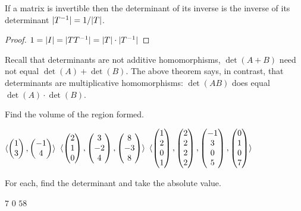\begin{corollary}
If a matrix is invertible then the determinant of its inverse is the
inverse of its determinant $\deter{T^{-1}}=1/\deter{T}$.
\end{corollary}

\begin{proof}
$1=\deter{I}=\deter{TT^{-1}}=\deter{T}\cdot\deter{T^{-1}}$  
\end{proof}

Recall that determinants are not additive homomorphisms, 
$\det(A+B)$ need not equal $\det(A)+\det(B)$.
The above theorem says, in contrast, that determinants are
multiplicative homomorphisms:
$\det(AB)$ does equal $\det(A)\cdot \det(B)$.


\begin{exercises}
  \item 
    Find the volume of the region formed.
    \begin{exparts}
      \partsitem $\langle\begin{pmatrix} 1 \\ 3 \end{pmatrix},\begin{pmatrix} -1 \\ 4 \end{pmatrix}\rangle$
      \partsitem $\langle\begin{pmatrix} 2 \\ 1 \\ 0 \end{pmatrix},\begin{pmatrix} 3 \\ -2 \\ 4 \end{pmatrix},
                              \begin{pmatrix} 8 \\ -3 \\ 8 \end{pmatrix}\rangle$
      \partsitem $\langle\begin{pmatrix} 1 \\ 2 \\ 0 \\ 1 \end{pmatrix},
                             \begin{pmatrix} 2 \\ 2 \\ 2 \\ 2 \end{pmatrix},
                             \begin{pmatrix} -1 \\ 3 \\ 0 \\ 5 \end{pmatrix},
                             \begin{pmatrix} 0 \\ 1 \\ 0 \\ 7 \end{pmatrix}\rangle$
    \end{exparts}
    \begin{answer}
      For each, find the determinant and take the absolute value.
      \begin{exparts*}
        \partsitem $7$
        \partsitem $0$
        \partsitem $58$
      \end{exparts*}
    \end{answer}

\end{exercises}
